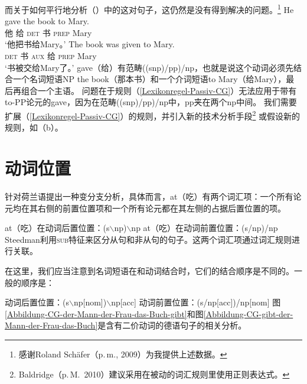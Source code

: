 \noindent
\addlines
而关于如何平行地分析（）中的这对句子，这仍然是没有得到解决的问题。\footnote{%
  感谢Roland Sch\"{a}fer（p.\,m., 2009）为我提供上述数据。
}
\eal
\ex 
\gll He gave the book to Mary.\\
他 给 \textsc{det} 书 \textsc{prep} Mary\\
\glt `他把书给Mary。'
\ex 
\gll The book was given to Mary.\\
\textsc{det} 书  \textsc{aux} 给 \textsc{prep} Mary\\
\glt `书被交给Mary了。'
\zl
gave（给）有范畴((s\bs np)/pp)/np，也就是说这个动词必须先结合一个名词短语NP the book（那本书）和一个介词短语to Mary（给Mary），最后再组合一个主语。
问题在于规则（\ref{Lexikonregel-Passiv-CG}）无法应用于带有to-PP论元的gave，因为在范畴((s\bs np)/pp)/np中，pp夹在两个np中间。
我们需要扩展（\ref{Lexikonregel-Passiv-CG}）的规则，并引入新的技术分析手段\footnote{%
  Baldridge（p.\,M.\ 2010）建议采用在被动的词汇规则里使用正则表达式。
 }
或假设新的规则，如（b）。

\section{动词位置}
\label{sec-Verbstellung-CG-Steedman}

\mbox{}\citet[]{Steedman2000a-u}
针对荷兰语提出一种变分支分析，具体而言，at（吃）有两个词汇项：一个所有论元均在其右侧的前置位置项和一个所有论元都在其左侧的占据后置位置的项。

\eal
\ex at（吃）在动词后置位置：(s$\backslash$np)$\backslash$np
\ex at（吃）在动词前置位置：(s/np)/np
\zl
Steedman利用\textsc{sub}特征来区分从句和非从句的句子。这两个词汇项通过词汇规则进行关联。

在这里，我们应当注意到名词短语在和动词结合时，它们的结合顺序是不同的。一般的顺序是：

\eal
\label{CG-Verbbewegung}
\ex 动词后置位置：(s$\backslash$np[nom])$\backslash$np[acc]
\ex 动词前置位置：(s/np[acc])/np[nom]
\zl
图\ref{Abbildung-CG-der-Mann-der-Frau-das-Buch-gibt}和图\ref{Abbildung-CG-gibt-der-Mann-der-Frau-das-Buch}是含有二价动词的德语句子的相关分析。

